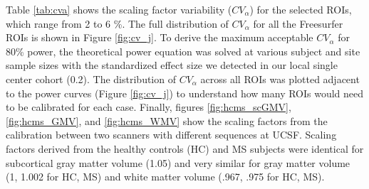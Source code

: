 Table \ref{tab:cva} shows the scaling factor variability ($CV_{\alpha}$) for the selected ROIs, which range from 2 to 6 \%. The full distribution of $CV_{\alpha}$ for all the Freesurfer ROIs is shown in Figure \ref{fig:cv_j}. To derive the maximum acceptable $CV_{\alpha}$ for 80\% power, the theoretical power equation was solved at various subject and site sample sizes with the standardized effect size we detected in our local single center cohort (0.2). The distribution of $CV_{\alpha}$ across all ROIs was plotted adjacent to the power curves (Figure \ref{fig:cv_j}) to understand how many ROIs would need to be calibrated for each case. Finally, figures \ref{fig:hcms_scGMV}, \ref{fig:hcms_GMV}, and \ref{fig:hcms_WMV} show the scaling factors from the calibration between two scanners with different sequences at UCSF. Scaling factors derived from the healthy controls (HC) and MS subjects were identical for subcortical gray matter volume (1.05) and very similar for gray matter volume (1, 1.002 for HC, MS) and white matter volume (.967, .975 for HC, MS).